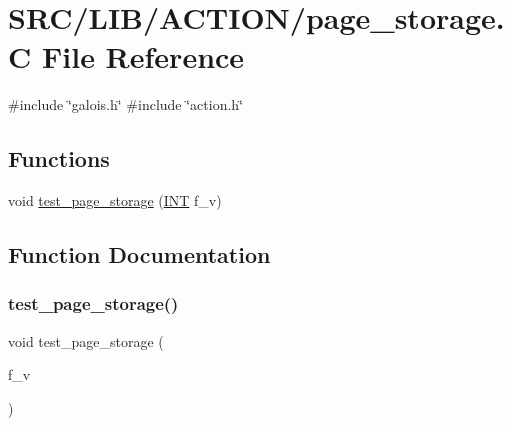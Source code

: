 \hypertarget{page__storage_8_c}{}\section{S\+R\+C/\+L\+I\+B/\+A\+C\+T\+I\+O\+N/page\+\_\+storage.C File Reference}
\label{page__storage_8_c}
{\ttfamily \#include \char`\"{}galois.\+h\char`\"{}}\newline
{\ttfamily \#include \char`\"{}action.\+h\char`\"{}}\newline
\subsection*{Functions}
\begin{DoxyCompactItemize}
\item 
void \mbox{\hyperlink{page__storage_8_c_ab9be845ce39a334f6e2b360a93c2ed2a}{test\+\_\+page\+\_\+storage}} (\mbox{\hyperlink{galois_8h_a09fddde158a3a20bd2dcadb609de11dc}{I\+NT}} f\+\_\+v)
\end{DoxyCompactItemize}


\subsection{Function Documentation}
\mbox{\label{page__storage_8_c_ab9be845ce39a334f6e2b360a93c2ed2a}} 
\subsubsection{\texorpdfstring{test\+\_\+page\+\_\+storage()}{test\_page\_storage()}}
{\footnotesize\ttfamily void test\+\_\+page\+\_\+storage (\begin{DoxyParamCaption}\item[{\mbox{\hyperlink{galois_8h_a09fddde158a3a20bd2dcadb609de11dc}{I\+NT}}}]{f\+\_\+v }\end{DoxyParamCaption})}

